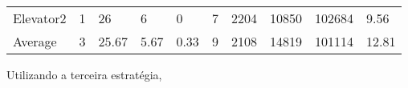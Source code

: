 \documentclass[a4paper]{article}
\begin{document}
\begin{table}[h]
\begin{tabular}{@{}llllllllll@{}}
Elevator2 & 1        & 26            & 6           & 0                                                               & 7                                                                  & 2204                                                         & 10850                                                 & 102684                                                   & 9.56         \\
Average   & 3     & 25.67         & 5.67        & 0.33                                                               & 9                                                               & 2108                                                         & 14819                                                 & 101114                                                   &  12.81         \\ \bottomrule
\end{tabular}
\end{table}

Utilizando a terceira estratégia,
\end{document}
